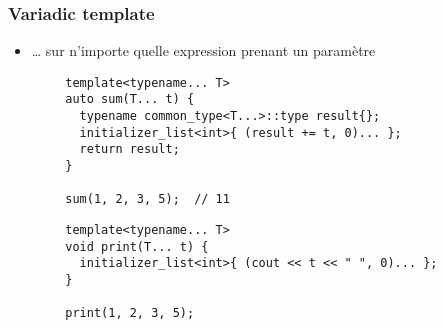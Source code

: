 \documentclass[C++.tex]{subfiles}
\begin{document}
\begin{frame}[fragile]
	\frametitle{Variadic template}
	\begin{itemize}
		\item \ldots{} sur n'importe quelle expression prenant un paramètre

	\end{itemize}

	\begin{verbatim}
		template<typename... T>
		auto sum(T... t) {
		  typename common_type<T...>::type result{};
		  initializer_list<int>{ (result += t, 0)... };
		  return result;
		}

		sum(1, 2, 3, 5);  // 11
	\end{verbatim}

	\begin{verbatim}
		template<typename... T>
		void print(T... t) {
		  initializer_list<int>{ (cout << t << " ", 0)... };
		}

		print(1, 2, 3, 5);
	\end{verbatim}

\end{frame}
\end{document}
